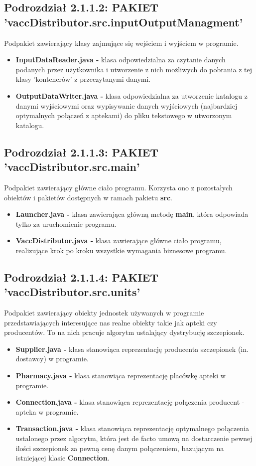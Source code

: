 \documentclass[a4paper]{article}
\begin{document}
\subsection*{Podrozdział 2.1.1.2: PAKIET 'vaccDistributor.src.inputOutputManagment'}
Podpakiet zawierający klasy zajmujące się wejściem i wyjściem w programie.
\begin{itemize}
\item \textbf{InputDataReader.java -} klasa odpowiedzialna za czytanie danych podanych przez użytkownika i utworzenie z nich możliwych do pobrania z tej klasy 'kontenerów' z przeczytanymi danymi.
\item \textbf{OutputDataWriter.java -} klasa odpowiedzialna za utworzenie katalogu z danymi wyjściowymi oraz wypisywanie danych wyjściowych (najbardziej optymalnych połączeń z aptekami) do pliku tekstowego w utworzonym katalogu.
\end{itemize}

\subsection*{Podrozdział 2.1.1.3: PAKIET 'vaccDistributor.src.main'}
Podpakiet zawierający główne ciało programu. Korzysta ono z pozostałych obiektów i pakietów dostępnych w ramach pakietu \textbf{src}.
\begin{itemize}
\item \textbf{Launcher.java -} klasa zawierająca główną metodę \textbf{main}, która odpowiada tylko za uruchomienie programu.
\item \textbf{VaccDistributor.java -} klasa zawierające główne ciało programu, realizujące krok po kroku wszystkie wymagania biznesowe programu.
\end{itemize}

\subsection*{Podrozdział 2.1.1.4: PAKIET 'vaccDistributor.src.units'}
Podpakiet zawierający obiekty jednostek używanych w programie przedstawiających interesujące nas realne obiekty takie jak apteki czy producentów. To na nich pracuje algorytm ustalający dystrybucję szczepionek.
\begin{itemize}
\item \textbf{Supplier.java -} klasa stanowiąca reprezentację producenta szczepionek (in. dostawcy) w programie.
\item \textbf{Pharmacy.java -} klasa stanowiąca reprezentację placówkę apteki w programie.
\item \textbf{Connection.java -} klasa stanowiąca reprezentację połączenia producent - apteka w programie.
\item \textbf{Transaction.java -} klasa stanowiąca reprezentację optymalnego połączenia ustalonego przez algorytm, która jest de facto umową na dostarczenie pewnej ilości szczepionek za pewną cenę danym połączeniem, bazującym na istniejącej klasie \textbf{Connection}.
\end{itemize}
\end{document}
